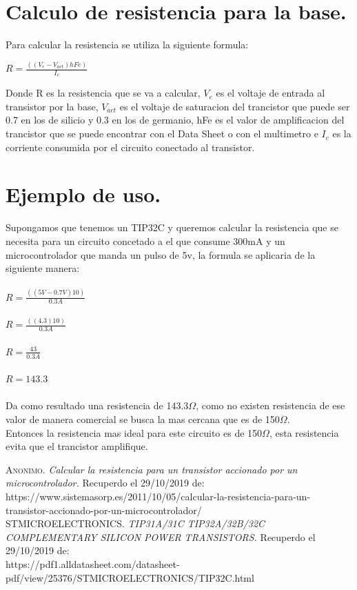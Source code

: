 \documentclass[letterpaper]{article}
\begin{document}
\section{Calculo de resistencia para la base.}
\begin{large}
    Para calcular la resistencia se utiliza la siguiente formula:\\
    \begin{center}
        \begin{LARGE}
            $R=\frac{((V_e-V_{act})hFe)}{I_c}$
        \end{LARGE}
    \end{center}
    Donde R es la resistencia que se va a calcular, $V_e$ es el voltaje de entrada al transistor por la base, $V_{act}$ es el voltaje de saturacion del trancistor que puede ser 0.7 en los de silicio y 0.3 en los de germanio, hFe es el valor de amplificacion del trancistor que se puede encontrar con el Data Sheet o con el multimetro e $I_c$ es la corriente consumida por el circuito conectado al transistor.
\end{large}
\section{Ejemplo de uso.}
\begin{large}
    Supongamos que tenemos un TIP32C y queremos calcular la resistencia que se necesita para un circuito concetado a el que consume 300mA y un microcontrolador que manda un pulso de 5v, la formula se aplicaria de la siguiente manera:\\\\
    $R=\frac{((5V-0.7V)10)}{0.3A}$\\\\
    $R=\frac{((4.3)10)}{0.3A}$\\\\
    $R=\frac{43}{0.3A}$\\\\
    $R=143.3$\\\\
    Da como resultado una resistencia de 143.3$\Omega$, como no existen resistencia de ese valor de manera comercial se busca la mas cercana que es de 150$\Omega$.\\
    Entonces la resistencia mas ideal para este circuito es de 150$\Omega$, esta resistencia evita que el trancistor amplifique.
\end{large}
\begin{thebibliography}{}
\textsc{Anonimo.} \textit{Calcular la resistencia para un transistor accionado por un microcontrolador.} Recuperdo el 29/10/2019 de:\\
https://www.sistemasorp.es/2011/10/05/calcular-la-resistencia-para-un-transistor-accionado-por-un-microcontrolador/\\
\textsc{STMICROELECTRONICS.} \textit{TIP31A/31C TIP32A/32B/32C COMPLEMENTARY SILICON POWER TRANSISTORS.} Recuperdo el 29/10/2019 de:\\
https://pdf1.alldatasheet.com/datasheet-pdf/view/25376/STMICROELECTRONICS/TIP32C.html\\
\end{thebibliography}
\end{document}
